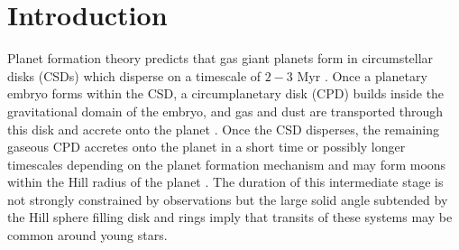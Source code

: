 \documentclass[twocolumn]{aa} %
\begin{document}
   \maketitle
%


\section{Introduction}

Planet formation theory predicts that gas giant planets form in circumstellar disks (CSDs) which disperse on a timescale of $2-3$ Myr \citep{Williams11}. 
%
Once a planetary embryo forms within the CSD, a circumplanetary disk (CPD) builds inside the gravitational domain of the embryo, and gas and dust are transported through this disk and accrete onto the planet \citep[e.g. see reviews by][]{Armitage11,Kley12}.
%
Once the CSD disperses, the remaining gaseous CPD accretes onto the planet in a short time \citep{Szulagyi14,Perez15} or possibly longer timescales depending on the planet formation mechanism \citep{Szulagyi17} and may form moons within the Hill radius of the planet \citep{Canup02}.
%
The duration of this intermediate stage is not strongly constrained by observations \citep[upper limits of mm-sized particles to CPDs around known exoplanets are reported in][]{Perez19} but the large solid angle subtended by the Hill sphere filling disk and rings imply that transits of these systems may be common around young stars.
\end{document}
